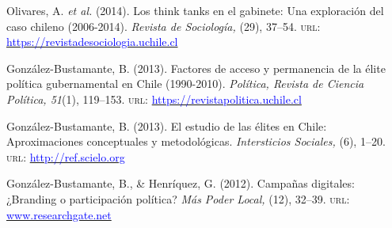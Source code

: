 \begin{publications}
\begin{benumerate}{9}
\item{\small Olivares, A. {\itshape et al.} (2014). Los think tanks en el gabinete: Una exploración del caso chileno (2006-2014). {\itshape Revista de Sociolog\'ia,} (29), 37--54. {\scshape url}: \href{https://revistadesociologia.uchile.cl/index.php/RDS/article/view/36177}{\textcolor{blue}{https://revistadesociologia.uchile.cl}}} \vspace{1mm}

\item{\small Gonz\'alez-Bustamante, B. (2013). Factores de acceso y permanencia de la élite política gubernamental en Chile (1990-2010). {\itshape Pol\'itica, Revista de Ciencia Pol\'itica, 51}(1), 119--153. {\scshape url}: \href{https://revistapolitica.uchile.cl/index.php/RP/article/view/27436}{\textcolor{blue}{https://revistapolitica.uchile.cl}}} \vspace{1mm}

\item{\small Gonz\'alez-Bustamante, B. (2013). El estudio de las élites en Chile: Aproximaciones conceptuales y metodológicas. {\itshape Intersticios Sociales,} (6), 1--20. {\scshape url}: \href{http://ref.scielo.org/zrnp2k}{\textcolor{blue}{http://ref.scielo.org}}} \vspace{1mm}

\item{\small Gonz\'alez-Bustamante, B., \& Henr\'iquez, G. (2012). Campañas digitales: ¿Branding o participación política? {\itshape M\'as Poder Local,} (12), 32--39. {\scshape url}: \href{https://www.researchgate.net/publication/260517478_Campanas_digitales_Branding_o_participacion_politica_El_rol_de_las_redes_sociales_en_la_ultima_campana_presidencial_chilena}{\textcolor{blue}{www.researchgate.net}}} \vspace{1mm}
\end{benumerate}

\end{publications}
